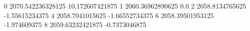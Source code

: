 0 2070.542236328125 10.172607421875
1 2060.36962890625 0.0
2 2058.8134765625 -1.55615234375
4 2058.7041015625 -1.66552734375
6 2058.39501953125 -1.974609375
8 2059.63232421875 -0.7373046875
